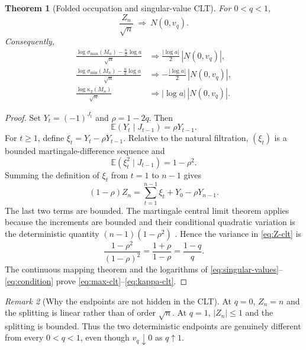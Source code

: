 \documentclass[11pt,a4paper]{amsart}
\newtheorem{theorem}{Theorem}[section]
\theoremstyle{definition}
\theoremstyle{remark}
\newtheorem{remark}[theorem]{Remark}
\newcommand{\Exp}{\mathbb E}
\begin{document}
\begin{theorem}[Folded occupation and singular-value CLT]
\label{thm:clt}
For $0<q<1$,
\begin{equation}\label{eq:Z-clt}
 \frac{Z_n}{\sqrt n}\ \Longrightarrow\ N(0,v_q).
\end{equation}
Consequently,
\begin{align}
 \frac{\log\sigma_{\max}(M_n)-\frac n2\log a}{\sqrt n}
 &\Longrightarrow \frac{|\log a|}{2}\,|N(0,v_q)|,
 \label{eq:max-clt}\\
 \frac{\log\sigma_{\min}(M_n)-\frac n2\log a}{\sqrt n}
 &\Longrightarrow-\frac{|\log a|}{2}\,|N(0,v_q)|,
 \label{eq:min-clt}\\
 \frac{\log\kappa_2(M_n)}{\sqrt n}
 &\Longrightarrow |\log a|\,|N(0,v_q)|.
 \label{eq:kappa-clt}
\end{align}
\end{theorem}

\begin{proof}
Set $Y_t=(-1)^{J_t}$ and $\rho=1-2q$.  Then
\[
 \Exp(Y_t\mid J_{t-1})=\rho Y_{t-1}.
\]
For $t\geq1$, define
$\xi_t=Y_t-\rho Y_{t-1}$.  Relative to the natural filtration,
$(\xi_t)$ is a bounded martingale-difference sequence and
\begin{equation}\label{eq:martingale-variance}
 \Exp(\xi_t^2\mid J_{t-1})=1-\rho^2.
\end{equation}
Summing the definition of $\xi_t$ from $t=1$ to $n-1$ gives
\begin{equation}\label{eq:martingale-decomposition}
 (1-\rho)Z_n=\sum_{t=1}^{n-1}\xi_t+Y_0-\rho Y_{n-1}.
\end{equation}
The last two terms are bounded.  The martingale central limit theorem
applies because the increments are bounded and their conditional
quadratic variation is the deterministic quantity
$(n-1)(1-\rho^2)$ \cite{Brown1971}.  Hence the variance in
\eqref{eq:Z-clt} is
\[
 \frac{1-\rho^2}{(1-\rho)^2}
 =\frac{1+\rho}{1-\rho}=\frac{1-q}{q}.
\]
The continuous mapping theorem and the logarithms of
\eqref{eq:singular-values}--\eqref{eq:condition} prove
\eqref{eq:max-clt}--\eqref{eq:kappa-clt}.
\end{proof}

\begin{remark}[Why the endpoints are not hidden in the CLT]
At $q=0$, $Z_n=n$ and the splitting is linear rather than of order
$\sqrt n$.  At $q=1$, $|Z_n|\leq1$ and the splitting is bounded.  Thus
the two deterministic endpoints are genuinely different from every
$0<q<1$, even though $v_q\downarrow0$ as $q\uparrow1$.
\end{remark}
\end{document}
